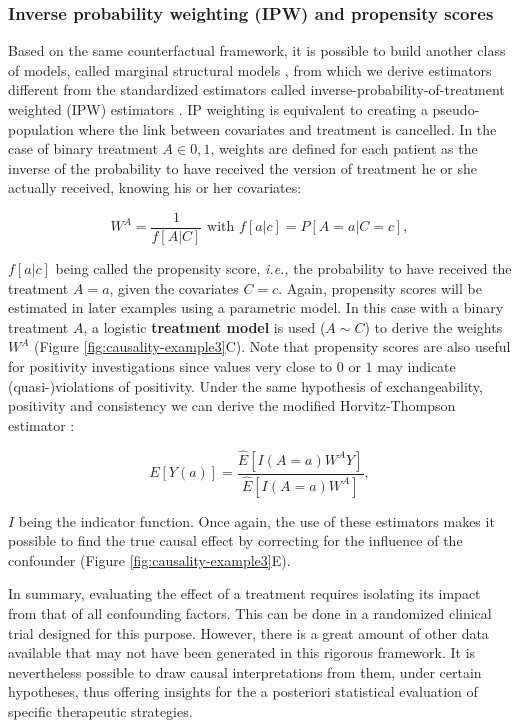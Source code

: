 \documentclass[a4paper,12pt,twoside,onecolumn,openright,final,oldfontcommands]{memoir}
\begin{document}
\subsubsection{Inverse probability weighting (IPW) and propensity
scores}\label{inverse-probability-weighting-ipw-and-propensity-scores}

Based on the same counterfactual framework, it is possible to build
another class of models, called marginal structural models
\citep{robins2000marginal}, from which we derive estimators different
from the standardized estimators called inverse-probability-of-treatment
weighted (IPW) estimators \citep{cole2008constructing}. IP weighting is
equivalent to creating a pseudo-population where the link between
covariates and treatment is cancelled. In the case of binary treatment
\(A \in {0 ,1}\), weights are defined for each patient as the inverse of
the probability to have received the version of treatment he or she
actually received, knowing his or her covariates:

\[W^A=\dfrac{1}{f[A|C]} \text{ with } f[a|c]=P[A=a|C=c],\]

\(f[a|c]\) being called the propensity score, \emph{i.e.,} the
probability to have received the treatment \(A=a\), given the covariates
\(C=c\). Again, propensity scores will be estimated in later examples
using a parametric model. In this case with a binary treatment \(A\), a
logistic \textbf{treatment model} is used (\(A\sim C\)) to derive the
weights \(W^A\) (Figure \ref{fig:causality-example3}C). Note that
propensity scores are also useful for positivity investigations since
values very close to \(0\) or \(1\) may indicate (quasi-)violations of
positivity. Under the same hypothesis of exchangeability, positivity and
consistency we can derive the modified Horvitz-Thompson estimator
\citep{horvitz1952generalization, hernan2020causal}:

\begin{equation}
E[Y(a)]=\dfrac{\hat{E}[I(A=a)W^{A}Y]}{\hat{E}[I(A=a)W^A]},
\label{eq:ipweq2}
\end{equation}

\(I\) being the indicator function. Once again, the use of these
estimators makes it possible to find the true causal effect by
correcting for the influence of the confounder (Figure
\ref{fig:causality-example3}E).

In summary, evaluating the effect of a treatment requires isolating its
impact from that of all confounding factors. This can be done in a
randomized clinical trial designed for this purpose. However, there is a
great amount of other data available that may not have been generated in
this rigorous framework. It is nevertheless possible to draw causal
interpretations from them, under certain hypotheses, thus offering
insights for the a posteriori statistical evaluation of specific
therapeutic strategies.
\end{document}
